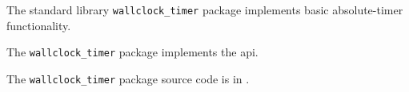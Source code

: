 
The standard library {\tt wallclock\_timer} package implements basic absolute-timer functionality.

The {\tt wallclock\_timer} package implements the  api.

The {\tt wallclock\_timer} package source code is in .


